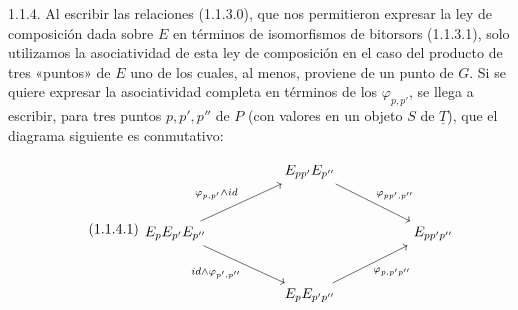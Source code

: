 
1.1.4.  Al escribir las relaciones (1.1.3.0), que nos permitieron
expresar la ley de composición dada sobre $E$ en términos de
isomorfismos de bitorsors (1.1.3.1), solo utilizamos la asociatividad de
esta ley de composición en el caso del producto de tres «puntos» de $E$
uno de los cuales, al menos, proviene de un punto de $G$. Si se quiere
expresar la asociatividad completa en términos de los
$\varphi_{p,p'}$, se llega a escribir, para tres puntos $p,p',p''$ de
$P$ (con valores en un objeto $S$ de $\underline{T}$), que el diagrama
siguiente es conmutativo:

\begin{equation}\tag{1.1.4.1}
\begin{tikzcd}[column sep=huge, row sep=large]
 & E_{pp'}E_{p''} \arrow[dr, "{\varphi_{pp',p''}}"] & \\
E_{p}E_{p'}E_{p''} \arrow[ur, "{\varphi_{p,p'}\wedge id}"] \arrow[dr, "{id\wedge\varphi_{p',p''}}"'] & & E_{pp'p''} \\
 & E_{p}E_{p'p''} \arrow[ur, "{\varphi_{p,p'p''}}"'] &
\end{tikzcd}
\end{equation}
